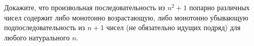 Докажите, что произвольная последовательность из $n^2 + 1$ попарно различных чисел содержит либо
монотонно возрастающую, либо монотонно убывающую подпоследовательность из $n + 1$ чисел (не обязательно
идущих подряд) для любого натурального $n$.
